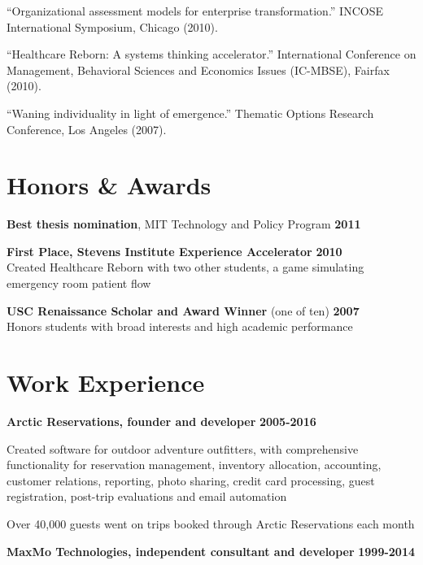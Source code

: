 \newpage

``Organizational assessment models for enterprise transformation.'' INCOSE International Symposium, Chicago (2010).

``Healthcare Reborn: A systems thinking accelerator.'' International Conference on Management, Behavioral Sciences and Economics Issues (IC-MBSE), Fairfax (2010).

``Waning individuality in light of emergence.'' Thematic Options Research Conference, Los Angeles (2007).

\section*{Honors \& Awards}

\textbf{Best thesis nomination}, MIT Technology and Policy Program \hfill \textbf{2011}

\textbf{First Place, Stevens Institute Experience Accelerator} \hfill \textbf{2010} \\
	Created Healthcare Reborn with two other students, a game simulating emergency room patient flow

\textbf{USC Renaissance Scholar and Award Winner} (one of ten) \hfill \textbf{2007} \\
	Honors students with broad interests and high academic performance

\section*{Work Experience} 

\textbf{Arctic Reservations, founder and developer} \hfill \textbf{2005-2016}
	
	\begin{list2}
		\item Created software for outdoor adventure outfitters, with comprehensive functionality for reservation management, inventory allocation, accounting, customer relations, reporting, photo sharing, credit card processing, guest registration, post-trip evaluations and email automation
	    \item Over 40,000 guests went on trips booked through Arctic Reservations each month
	\end{list2}
	
\textbf{MaxMo Technologies, independent consultant and developer} \hfill \textbf{1999-2014}
	
